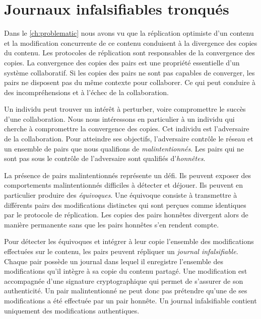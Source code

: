 
\chapter{Journaux infalsifiables tronqués}\label{ch:pruned-log}

\minitoc{}
\clearpage

Dans le \autoref{ch:problematic} nous avons vu que la réplication optimiste d'un contenu et la modification concurrente de ce contenu conduisent à la divergence des copies du contenu.
Les protocoles de réplication sont responsables de la convergence des copies.
La convergence des copies des pairs est une propriété essentielle d'un système collaboratif.
Si les copies des pairs ne sont pas capables de converger, les pairs ne disposent pas du même contexte pour collaborer.
Ce qui peut conduire à des incompréhensions et à l'échec de la collaboration.

Un individu peut trouver un intérêt à perturber, voire compromettre le succès d'une collaboration.
Nous nous intéressons en particulier à un individu qui cherche à compromettre la convergence des copies.
Cet individu est l'adversaire de la collaboration.
Pour atteindre ses objectifs, l'adversaire contrôle le réseau et un ensemble de pairs que nous qualifions de \emph{malintentionnés}.
Les pairs qui ne sont pas sous le contrôle de l'adversaire sont qualifiés d'\emph{honnêtes}.

La présence de pairs malintentionnés représente un défi.
Ils peuvent exposer des comportements malintentionnés difficiles à détecter et déjouer.
Ils peuvent en particulier produire des \emph{équivoques}.
Une équivoque consiste à transmettre à différents pairs des modifications distinctes qui sont perçues comme identiques par le protocole de réplication.
Les copies des pairs honnêtes divergent alors de manière permanente sans que les pairs honnêtes s'en rendent compte.

Pour détecter les équivoques et intégrer à leur copie l'ensemble des modifications effectuées sur le contenu, les pairs peuvent répliquer un \emph{journal infalsifiable}.
Chaque pair possède un journal dans lequel il enregistre l'ensemble des modifications qu'il intègre à sa copie du contenu partagé.
Une modification est accompagnée d'une signature cryptographique qui permet de s'assurer de son authenticité.
Un pair malintentionné ne peut donc pas prétendre qu'une de ses modifications a été effectuée par un pair honnête.
Un journal infalsifiable contient uniquement des modifications authentiques.

